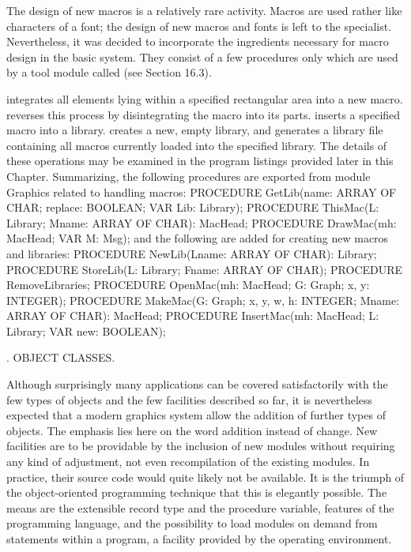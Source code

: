 The design of new macros is a relatively rare activity. Macros are used rather like characters of a font; the design of new macros and fonts is left to the specialist. Nevertheless, it was decided to incorporate the ingredients necessary for macro design in the basic system. They consist of a few procedures only which are used by a tool module called  (see Section 16.3).

 integrates all elements lying within a specified rectangular area into a new macro.  reverses this process by disintegrating the macro into its parts.  inserts a specified macro into a library.  creates a new, empty library, and  generates a library file containing all macros currently loaded into the specified library. The details of these operations may be examined in the program listings provided later in this Chapter. Summarizing, the following procedures are exported from module Graphics related to handling macros:
\begintt
PROCEDURE GetLib(name: ARRAY OF CHAR; replace: BOOLEAN;
                 VAR Lib: Library);
PROCEDURE ThisMac(L: Library; Mname: ARRAY OF CHAR): MacHead;
PROCEDURE DrawMac(mh: MacHead; VAR M: Msg);
\endtt
and the following are added for creating new macros and libraries:
\begintt
PROCEDURE NewLib(Lname: ARRAY OF CHAR): Library;
PROCEDURE StoreLib(L: Library; Fname: ARRAY OF CHAR);
PROCEDURE RemoveLibraries;
PROCEDURE OpenMac(mh: MacHead; G: Graph; x, y: INTEGER);
PROCEDURE MakeMac(G: Graph; x, y, w, h: INTEGER;
                  Mname: ARRAY OF CHAR): MacHead;
PROCEDURE InsertMac(mh: MacHead; L: Library; VAR new: BOOLEAN);
\endtt

. OBJECT CLASSES.

Although surprisingly many applications can be covered satisfactorily with the few types of objects and the few facilities described so far, it is nevertheless expected that a modern graphics system allow the addition of further types of objects. The emphasis lies here on the word addition instead of change. New facilities are to be providable by the inclusion of new modules without requiring any kind of adjustment, not even recompilation of the existing modules. In practice, their source code would quite likely not be available. It is the triumph of the object-oriented programming technique that this is elegantly possible. The means are the extensible record type and the procedure variable, features of the programming language, and the possibility to load modules on demand from statements within a program, a facility provided by the operating environment.


